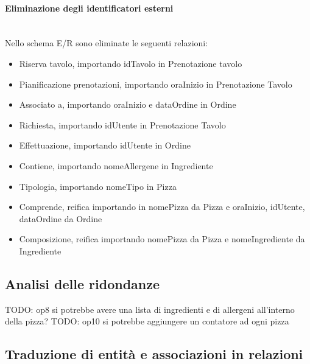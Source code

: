 \documentclass[a4paper,12pt, oneside]{article}
\begin{document}
\paragraph{Eliminazione degli identificatori esterni}
\hphantom{A}\\    %
Nello schema E/R sono eliminate le seguenti relazioni:
\begin{itemize}
    \item Riserva tavolo, importando idTavolo in Prenotazione tavolo
    \item Pianificazione prenotazioni, importando oraInizio in Prenotazione Tavolo
    \item Associato a, importando oraInizio e dataOrdine in Ordine
    \item Richiesta, importando idUtente in Prenotazione Tavolo
    \item Effettuazione, importando idUtente in Ordine
    \item Contiene, importando nomeAllergene in Ingrediente
    \item Tipologia, importando nomeTipo in Pizza
    \item Comprende, reifica importando in nomePizza da Pizza e oraInizio, idUtente, dataOrdine da Ordine
    \item Composizione, reifica importando nomePizza da Pizza e nomeIngrediente da Ingrediente
\end{itemize}

\subsection{Analisi delle ridondanze}

TODO: op8 si potrebbe avere una lista di ingredienti e di allergeni all'interno della pizza?
TODO: op10 si potrebbe aggiungere un contatore ad ogni pizza

\subsection{Traduzione di entità e associazioni in relazioni}
\end{document}
